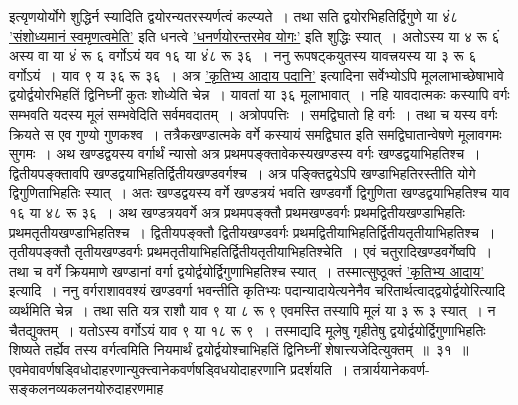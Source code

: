 \documentclass[11pt, openany]{book}
\begin{document}
\begin{sloppypar}
\noindent इत्यृणयोर्योगे शुद्धिर्न स्यादिति द्वयोरन्यतरस्यर्णत्वं कल्प्यते~।
तथा सति द्वयोरभिहतिर्द्विगुणे या ४ं८ \hyperref[1.7]{'संशोध्यमानं स्वमृणत्वमेति'} इति धनत्वे \hyperref[1.3]{'धनर्णयोरन्तरमेव योगः'} इति शुद्धिः स्यात्~। अतोऽस्य या ४ रू ६ं अस्य वा या ४ं रू ६ वर्गोऽयं यव १६ या ४ं८ रू ३६~। ननु रूपषट्कयुतस्य यावत्त्रयस्य या ३ रू ६ वर्गोऽयं~। याव ९ य ३६ रू ३६~। अत्र \hyperref[3.31]{'कृतिभ्य आदाय पदानि'} इत्यादिना सर्वेभ्योऽपि मूललाभाच्छेषाभावे द्वयोर्द्वयोरभिहतिं द्विनिघ्नीं कुतः शोध्येति चेन्न~। यावतां या ३६ मूलाभावात्~। नहि यावदात्मकः कस्यापि वर्गः सम्भवति यदस्य मूलं सम्भवेदिति सर्वमवदातम्~। अत्रोपपत्तिः~। समद्विघातो हि वर्गः~। तथा च यस्य वर्गः क्रियते स एव गुण्यो गुणकश्व~। तत्रैकखण्डात्मके वर्गे कस्यायं समद्विघात इति समद्विघातान्वेषणे मूलावगमः सुगमः~। अथ खण्डद्वयस्य वर्गार्थं न्यासो \; अत्र प्रथमपङ्क्तावेकस्यखण्डस्य वर्गः खण्डद्वयाभिहतिश्च~। द्वितीयपङ्क्तावपि खण्डद्वयाभिहतिर्द्वितीयखण्डवर्गश्च~। अत्र पङ्क्तिद्वयेऽपि खण्डाभिहतिरस्तीति योगे द्विगुणिताभिहतिः स्यात्~। अतः खण्डद्वयस्य वर्गे खण्डत्रयं भवति खण्डवर्गौ द्विगुणिता खण्डद्वयाभिहतिश्च याव १६ या ४८ रू ३६~। अथ खण्डत्रयवर्गे \; अत्र प्रथमपङ्क्तौ प्रथमखण्डवर्गः प्रथमद्वितीयखण्डाभिहतिः प्रथमतृतीयखण्डाभिहतिश्च~। द्वितीयपङ्क्तौ द्वितीयखण्डवर्गः प्रथमद्वितीयाभिहतिर्द्वितीयतृतीयाभिहतिश्च~। तृतीयपङ्क्तौ तृतीयखण्डवर्गः प्रथमतृतीयाभिहतिर्द्वितीयतृतीयाभिहतिश्चेति~। एवं चतुरादिखण्डवर्गेष्वपि~। तथा च वर्गे क्रियमाणे खण्डानां वर्गा द्वयोर्द्वयोर्द्विगुणाभिहतिश्च स्यात्~। तस्मात्सुष्ठूक्तं \hyperref[3.31]{'कृतिभ्य आदाय'} इत्यादि~। ननु वर्गराशाववश्यं खण्डवर्गा भवन्तीति कृतिभ्यः पदान्यादायेत्यनेनैव चरितार्थत्वाद्द्वयोर्द्वयोरित्यादि व्यर्थमिति चेन्न~। तथा सति यत्र राशौ याव ९ या ८ रू ९ एवमस्ति तस्यापि मूलं या ३ रू ३ स्यात्~। न चैतद्युक्तम्~। यतोऽस्य वर्गोऽयं याव ९ या १८ रू ९~। तस्माद्यदि मूलेषु गृहीतेषु द्वयोर्द्वयोर्द्विगुणाभिहतिः शिष्यते तर्ह्येव तस्य वर्गत्वमिति नियमार्थं द्वयोर्द्वयोश्चाभिहतिं द्विनिघ्नीं शेषात्त्यजेदित्युक्तम्~॥~३१~॥ \\

{\small एवमेवावर्णषड्विधोदाहरणान्युक्त्त्वानेकवर्णषड्विधयोदाहरणानि प्रदर्शयति~। तत्रार्ययानेकवर्ण-सङ्कलनव्यकलनयोरुदाहरणमाह\textendash }
\end{sloppypar}
\end{document}
